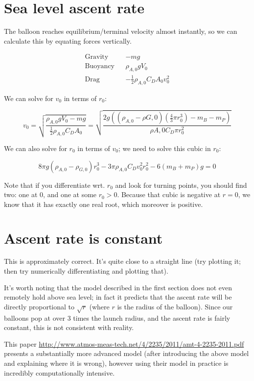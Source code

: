 \documentclass{article}
\begin{document}
\section{Sea level ascent rate}

The balloon reaches equilibrium/terminal velocity almost instantly,
so we can calculate this by equating forces vertically.

\begin{align*}
    \text{Gravity} && -mg \\
    \text{Buoyancy} && \rho_{A,0} g V_0 \\
    \text{Drag} && -\frac{1}{2} \rho_{A,0} C_D A_0 v_0^2
\end{align*}

We can solve for $v_0$ in terms of $r_0$:

\[
    v_0
    = \sqrt{
        \frac{ \rho_{A,0}gV_0 - mg }%
             { \frac{1}{2} \rho_{A,0} C_D A_0 }
        }
%
    = \sqrt{
        \frac{ 2g ((\rho_{A,0} - \rho{G,0}) (\frac{4}{3} \pi r_0^3) - m_B - m_P) }%
             { \rho{A,0} C_D \pi r_0^2 }
        }
\]

We can also solve for $r_0$ in terms of $v_0$; we need to solve this cubic in $r_0$:

\[
       8 \pi g (\rho_{A,0} - \rho_{G,0}) r_0^3
     - 3 \pi \rho_{A,0} C_D v_0^2 r_0 ^2
     - 6 (m_B + m_P) g
      = 0
\]

Note that if you differentiate wrt. $r_0$ and look for turning points, you should find two:
one at $0$, and one at some $r_0 > 0$. Because that cubic is negative at $r = 0$, we know
that it has exactly one real root, which moreover is positive.

\section{Ascent rate is constant}

This is approximately correct. It's quite close to a straight line
(try plotting it; then try numerically differentiating and plotting that).

It's worth noting that the model described in the first section does not even remotely hold
above sea level; in fact it predicts that the ascent rate will be directly proportional
to $\sqrt{r}$ (where $r$ is the radius of the balloon). Since our balloons pop at over
$3$ times the launch radius, and the ascent rate is fairly constant,
this is not consistent with reality.

This paper \url{http://www.atmos-meas-tech.net/4/2235/2011/amt-4-2235-2011.pdf} presents
a substantially more advanced model (after introducing the above model and explaining
where it is wrong), however using their model in practice is incredibly computationally
intensive.
\end{document}
